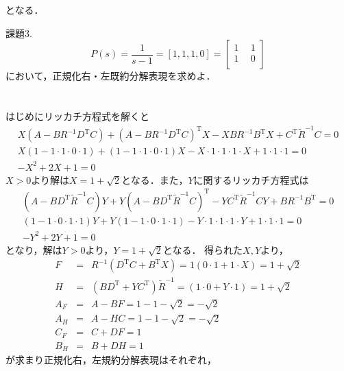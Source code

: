\documentclass[a4paper,12pt]{jarticle}
\begin{document}
となる．
%
\newpage
 \begin{itembox}[l]{\Large{課題3.}}
%
  \begin{equation}
   P(s)=\frac{1}{s-1}=[1,1,1,0]=\left[
  \begin{array}{c|c}
   1 ~&~ 1  \\ \hline
   1 ~&~ 0   \\ 
  \end{array}
  \right]
  \end{equation}
%
において，正規化右・左既約分解表現を求めよ．  
 \end{itembox}
\vspace{-10mm}
\section*{}
はじめにリッカチ方程式を解くと
%
 \begin{eqnarray}
  X(A-BR^{-1}D^{\mathrm{T}}C)+(A-BR^{-1}D^{\mathrm{T}}C)^{\mathrm{T}}X-XBR^{-1}B^{\mathrm{T}}X+C^{\mathrm{T}}\tilde{R}^{-1}C=0\\
 X(1-1\cdot1\cdot0\cdot1)+(1-1\cdot1\cdot0\cdot1)X-X\cdot1\cdot1\cdot1\cdot
  X+1\cdot1\cdot1=0\\
  -X^2+2X+1=0
\end{eqnarray}
%
$X>0$より解は$X=1+\sqrt{2}$となる．また，$Y$に関するリッカチ方程式は
%
 \begin{eqnarray}
(A-BD^{\mathrm{T}}\tilde{R}^{-1}C)Y+Y(A-BD^{\mathrm{T}}\tilde{R}^{-1}C)^{\mathrm{T}}-YC^{\mathrm{T}}\tilde{R}^{-1}CY+BR^{-1}B^{\mathrm{T}}=0\\
 (1-1\cdot0\cdot1\cdot1)Y+Y(1-1\cdot0\cdot1\cdot1)-Y\cdot1\cdot1\cdot1\cdot
  Y+1\cdot1\cdot1=0\\
  -Y^2+2Y+1=0
\end{eqnarray}
%
となり，解は$Y>0$より，$Y=1+\sqrt{2}$となる．
%
得られた$X,Y$より，
%
\begin{eqnarray}
 F&=&R^{-1}(D^{\mathrm{T}}C+B^{\mathrm{T}}X)=1(0\cdot1+1\cdot X)=1+\sqrt{2}\\
 H&=&(BD^{\mathrm{T}}+YC^{\mathrm{T}})\tilde{R}^{-1}=(1\cdot0+Y\cdot1)=1+\sqrt{2} \\
 A_F&=&A-BF=1-1-\sqrt{2}=-\sqrt{2}\\
 A_H&=&A-HC=1-1-\sqrt{2}=-\sqrt{2}\\
 C_F&=&C+DF=1\\
 B_H&=&B+DH=1
\end{eqnarray}
%
が求まり正規化右，左規約分解表現はそれぞれ，
\end{document}
